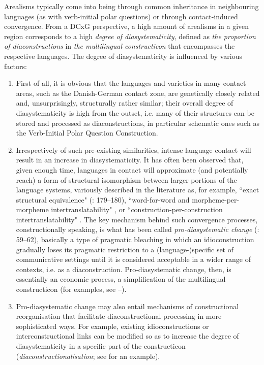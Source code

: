 \documentclass[output=paper]{langsci/langscibook}
\begin{document}
Arealisms typically come into being through common inheritance in neighbouring languages (as with verb-initial polar questions) or through contact-induced convergence. From a DCxG perspective, a high amount of arealisms in a given region corresponds to a high \textit{degree of diasystematicity}, defined as \textit{the proportion of diaconstructions} in \textit{the multilingual constructicon} that encompasses the respective languages. The degree of diasystematicity is influenced by various factors:

\begin{enumerate}
 \item First of all, it is obvious that the languages and varieties in many contact areas, such as the Danish-German contact zone, are genetically closely related and, unsurprisingly, structurally rather similar; their overall degree of diasystematicity is high from the outset, i.e. many of their structures can be stored and processed as diaconstructions, in particular schematic ones such as the Verb-Initial Polar Question Construction.

 \item Irrespectively of such pre-existing similarities, intense language contact will result in an increase in diasystematicity. It has often been observed that, given enough time, languages in contact will approximate (and potentially reach) a form of structural isomorphism between larger portions of the language systems, variously described in the literature as, for example, “exact structural equivalence" (\citealt{Heine.2005}: 179--180), “word-for-word and morpheme-per-morpheme intertranslatability" \citep[28]{Aikhenvald.2006}, or “construction-per-construction intertranslatability" \citep[149]{Hoder.2014}. The key mechanism behind such convergence processes, constructionally speaking, is what has been called \textit{pro-diasystematic change} (\citealt{Hoder.2018}: 59--62), basically a type of pragmatic bleaching in which an idioconstruction gradually loses its pragmatic restriction to a (language-)specific set of communicative settings until it is considered acceptable in a wider range of contexts, i.e. as a diaconstruction. Pro-diasystematic change, then, is essentially an economic process, a simplification of the multilingual constructicon (for examples, see --).

 \item Pro-diasystematic change may also entail mechanisms of constructional reorganisation that facilitate diaconstructional processing in more sophisticated ways. For example, existing idioconstructions or interconstructional links can be modified so as to increase the degree of diasystematicity in a specific part of the constructicon (\textit{diaconstructionalisation}; see  for an example).


\end{enumerate}
\end{document}
